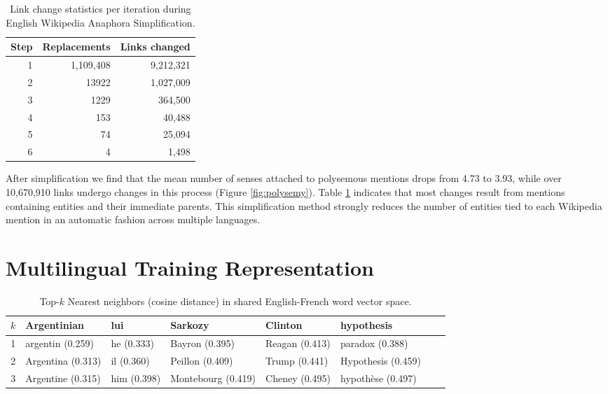 \documentclass[letterpaper]{article}
\begin{document}
\begin{table}
\caption{Link change statistics per iteration during English Wikipedia Anaphora Simplification.}
\centering
\begin{tabular}{ |r|r|r|}
\hline
Step & Replacements & Links changed\\
\hline
1 & 1,109,408 &  9,212,321\\
2 & 13922 & 1,027,009 \\
3 & 1229 & 364,500\\
4 & 153 & 40,488\\
5 & 74 & 25,094\\
6 & 4 & 1,498\\
\hline
\end{tabular}
\label{table:polysemy}
\end{table}

After simplification we find that the mean number of senses attached to polysemous mentions drops from 4.73 to 3.93, while over 10,670,910 links undergo changes in this process (Figure \ref{fig:polysemy}). Table \ref{table:polysemy} indicates that most changes result from mentions containing entities and their immediate parents. This simplification method strongly reduces the number of entities tied to each Wikipedia mention in an automatic fashion across multiple languages.

\section{Multilingual Training Representation}
\label{section:translation}

\begin{table*}[t]
\caption{Top-$k$ Nearest neighbors (cosine distance) in shared English-French word vector space.}
\begin{center}
\begin{tabular}{|r|l|l|l|l|l|l|l|}
\hline
$k$ & Argentinian & lui & Sarkozy & Clinton & hypothesis\\
\hline
1   & argentin (0.259)   & he (0.333) & Bayron (0.395) & Reagan (0.413) & paradox (0.388)\\
2    & Argentina (0.313)   & il (0.360) & Peillon (0.409) & Trump (0.441) & Hypothesis (0.459) \\
3    & Argentine (0.315)   & him (0.398) & Montebourg (0.419) & Cheney (0.495) & hypoth\`ese (0.497) \\
\hline
\end{tabular}
\end{center}
\label{table:translate}
\end{table*}
\end{document}

